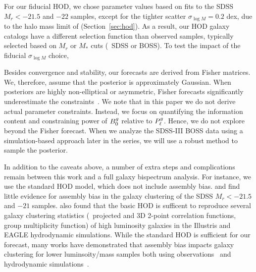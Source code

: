 For our fiducial HOD, we chose parameter values based on \cite{zheng2007} 
fits to the SDSS $M_r < -21.5$  and $-22$ samples, except for the tighter
scatter $\sigma_{\log M} = 0.2$ dex, due to the halo mass limit of \quij
(Section~\ref{sec:hod}). As a result, our HOD galaxy 
catalogs have a different selection function than observed samples, typically
selected based on $M_r$ or $M_*$ cuts (\eg~SDSS or BOSS). To test the impact
of the fiducial $\sigma_{\log M}$ choice, 

Besides convergence and stability, our forecasts are derived from Fisher
matrices. We, therefore, assume that the posterior is approximately Gaussian. 
When posteriors are highly non-elliptical or asymmetric, Fisher forecasts 
significantly underestimate the constraints~\citep{wolz2012}. We note that in
this paper we do not derive actual parameter constraints. Instead, we focus on
quantifying the information content and constraining power of $B^g_0$ relative to
$P^g_{\ell}$. Hence, we do not explore beyond the Fisher forecast. When we analyze
the SDSS-III BOSS data using a simulation-based approach later in the series,
we will use a robust method to sample the posterior. 

In addition to the caveats above, a number of extra steps and complications remain
between this work and a full galaxy bispectrum analysis. For instance, we use
the standard \cite{zheng2007} HOD model,
which does not include assembly bias. \cite{zentner2016} and \cite{vakili2019}
find little evidence for assembly bias in the galaxy clustering
of the SDSS $M_r < -21.5$  and $-21$ samples. \cite{beltz-mohrmann2020} 
also found that the basic HOD is sufficent to reproduce several galaxy
clustering statistics (\eg~projected and 3D 2-point correlation functions, group multiplicity function)
of high luminosity galaxies in the Illustris and EAGLE hydrodynamic
simulations. While the standard HOD is sufficient for our forecast, 
many works have demonstrated that assembly bias impacts galaxy
clustering for lower luminsoity/mass samples both using
observations~\citep{pujol2014, hearin2016, pujol2017, zentner2019, vakili2019, obuljen2020}
and hydrodynamic simulations~\citep{chaves-montero2016, beltz-mohrmann2020}. 
 
